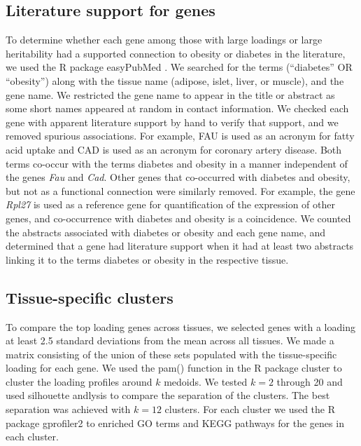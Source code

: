 \documentclass[
]{article}
\begin{document}
\subsection{Literature support for
genes}\label{literature-support-for-genes}

To determine whether each gene among those with large loadings or large
heritability had a supported connection to obesity or diabetes in the
literature, we used the R package easyPubMed \cite{easyPubMed}. We
searched for the terms (``diabetes'' OR ``obesity'') along with the
tissue name (adipose, islet, liver, or muscle), and the gene name. We
restricted the gene name to appear in the title or abstract as some
short names appeared at random in contact information. We checked each
gene with apparent literature support by hand to verify that support,
and we removed spurious associations. For example, FAU is used as an
acronym for fatty acid uptake and CAD is used as an acronym for coronary
artery disease. Both terms co-occur with the terms diabetes and obesity
in a manner independent of the genes \textit{Fau} and \textit{Cad}.
Other genes that co-occurred with diabetes and obesity, but not as a
functional connection were similarly removed. For example, the gene
\textit{Rpl27} is used as a reference gene for quantification of the
expression of other genes, and co-occurrence with diabetes and obesity
is a coincidence. We counted the abstracts associated with diabetes or
obesity and each gene name, and determined that a gene had literature
support when it had at least two abstracts linking it to the terms
diabetes or obesity in the respective tissue.

\subsection{Tissue-specific clusters}\label{tissue-specific-clusters}

To compare the top loading genes across tissues, we selected genes with
a loading at least 2.5 standard deviations from the mean across all
tissues. We made a matrix consisting of the union of these sets
populated with the tissue-specific loading for each gene. We used the
pam() function in the R package cluster \cite{Rcluster} to cluster the
loading profiles around \(k\) medoids. We tested \(k = 2\) through 20
and used silhouette andlysis to compare the separation of the clusters.
The best separation was achieved with \(k = 12\) clusters. For each
cluster we used the R package gprofiler2 \cite{Rgprofiler2} to enriched
GO terms and KEGG pathways for the genes in each cluster.
\end{document}
